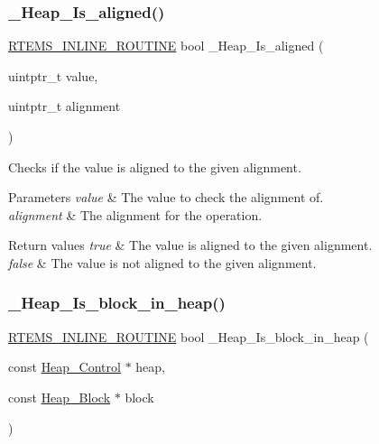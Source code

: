 \subsubsection{\texorpdfstring{\_Heap\_Is\_aligned()}{\_Heap\_Is\_aligned()}}
{\footnotesize\ttfamily \mbox{\hyperlink{group__RTEMSScoreBaseDefs_gac216239df231d5dbd15e3520b0b9313f}{R\+T\+E\+M\+S\+\_\+\+I\+N\+L\+I\+N\+E\+\_\+\+R\+O\+U\+T\+I\+NE}} bool \+\_\+\+Heap\+\_\+\+Is\+\_\+aligned (\begin{DoxyParamCaption}\item[{uintptr\+\_\+t}]{value,  }\item[{uintptr\+\_\+t}]{alignment }\end{DoxyParamCaption})}



Checks if the value is aligned to the given alignment. 


\begin{DoxyParams}{Parameters}
{\em value} & The value to check the alignment of. \\
\hline
{\em alignment} & The alignment for the operation.\\
\hline
\end{DoxyParams}

\begin{DoxyRetVals}{Return values}
{\em true} & The value is aligned to the given alignment. \\
\hline
{\em false} & The value is not aligned to the given alignment. \\
\hline
\end{DoxyRetVals}
\mbox{\label{group__RTEMSScoreHeap_gabc511a89a627aea2d91fbc21b95a4ae7}} 
\subsubsection{\texorpdfstring{\_Heap\_Is\_block\_in\_heap()}{\_Heap\_Is\_block\_in\_heap()}}
{\footnotesize\ttfamily \mbox{\hyperlink{group__RTEMSScoreBaseDefs_gac216239df231d5dbd15e3520b0b9313f}{R\+T\+E\+M\+S\+\_\+\+I\+N\+L\+I\+N\+E\+\_\+\+R\+O\+U\+T\+I\+NE}} bool \+\_\+\+Heap\+\_\+\+Is\+\_\+block\+\_\+in\+\_\+heap (\begin{DoxyParamCaption}\item[{const \mbox{\hyperlink{structHeap__Control}{Heap\+\_\+\+Control}} $\ast$}]{heap,  }\item[{const \mbox{\hyperlink{structHeap__Block}{Heap\+\_\+\+Block}} $\ast$}]{block }\end{DoxyParamCaption})}



